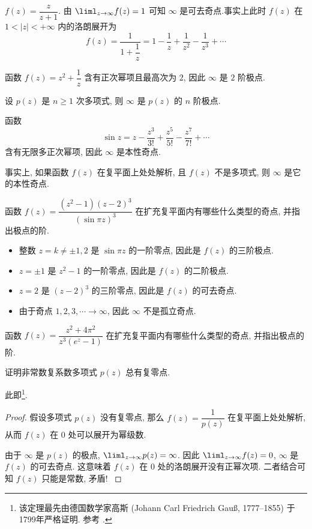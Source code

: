 \begin{example}
		$f(z)=\dfrac z{z+1}$.
	由 $\liml_{z\to\infty}f(z)=1$ 可知 $\infty$ 是可去奇点.事实上此时 $f(z)$ 在 $1<|z|<+\infty$ 内的洛朗展开为
		\[f(z)=\frac{1}{1+\dfrac1z}=1-\frac1z+\frac1{z^2}-\frac1{z^3}+\cdots\]
\end{example}

\begin{example}
		函数 $f(z)=z^2+\dfrac1z$
	{含有正次幂项且最高次为 $2$, 因此 $\infty$ 是 $2$ 阶极点.
	}
\end{example}

\begin{example}
		设 $p(z)$ 是 $n\ge1$ 次多项式,
	{则 $\infty$ 是 $p(z)$ 的 $n$ 阶极点.
	}
\end{example}

\begin{example}
		函数 
		\[\sin z=z-\frac{z^3}{3!}+\frac{z^5}{5!}-\frac{z^7}{7!}+\cdots\]
	{含有无限多正次幂项, 因此 $\infty$ 是本性奇点.
	}

	{事实上, 如果函数 $f(z)$ 在复平面上处处解析, 且 $f(z)$ 不是多项式, 则 $\infty$ 是它的本性奇点.
	}
\end{example}

\begin{example}
	函数 $f(z)=\dfrac{(z^2-1)(z-2)^3}{(\sin{\pi z})^3}$ 在扩充复平面内有哪些什么类型的奇点, 并指出极点的阶.
\end{example}

\begin{solution}
	\begin{itemize}
		\item 整数 $z=k\neq \pm1,2$ 是 $\sin{\pi z}$ 的一阶零点, 因此是 $f(z)$ 的三阶极点.
		\item $z=\pm1$ 是 $z^2-1$ 的一阶零点, 因此是 $f(z)$ 的二阶极点.
		\item $z=2$ 是 $(z-2)^3$ 的三阶零点, 因此是 $f(z)$ 的可去奇点.
		\item 由于奇点 $1,2,3,\cdots\to \infty$, 因此 $\infty$ 不是孤立奇点.
	\end{itemize}
\end{solution}

\begin{exercise}
	函数 $f(z)=\dfrac{z^2+4\pi^2}{z^3(e^z-1)}$ 在扩充复平面内有哪些什么类型的奇点, 并指出极点的阶.
\end{exercise}

\begin{example}\label{exam:algebraic-basic-theorem}
	证明非常数复系数多项式 $p(z)$ 总有复零点.
\end{example}
此即\footnote{
	该定理最先由德国数学家高斯 (Johann Carl Friedrich Gauß, 1777--1855) 于1799年严格证明.
	参考 \cite[第25章1节]{Kline1990}.
}.
\begin{proof}
	假设多项式 $p(z)$ 没有复零点, 那么 $f(z)=\dfrac1{p(z)}$ 在复平面上处处解析, 
{%
	从而 $f(z)$ 在 $0$ 处可以展开为幂级数.
}

{%
	由于 $\infty$ 是 $p(z)$ 的极点, $\liml_{z\to\infty}p(z)=\infty$.
}%
{%
	因此 $\liml_{z\to\infty}f(z)=0$, $\infty$ 是 $f(z)$ 的可去奇点.
}%
{%
	这意味着 $f(z)$ 在 $0$ 处的洛朗展开没有正幂次项.
}%
{%
	二者结合可知 $f(z)$ 只能是常数, 矛盾!\qedhere
}
\end{proof}

